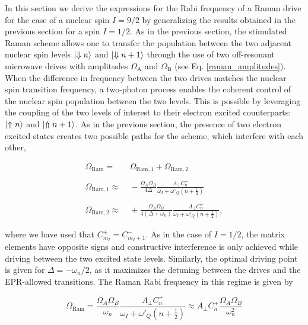 In this section we derive the expressions for the Rabi frequency of a Raman drive for the case of a nuclear spin $I=9/2$ by generalizing the results obtained in the previous section for a spin $I=1/2$. As in the previous section, the stimulated Raman scheme allows one to transfer the population between the two adjacent nuclear spin levels $\ket{\Downarrow n}$ and $\ket{\Downarrow n+1}$ through the use of two off-resonant microwave drives with amplitudes $\Omega_\text{A}$ and $\Omega_\text{B}$ (see Eq. \ref{raman_amplitudes}). When the difference in frequency between the two drives matches the nuclear spin transition frequency, a two-photon process enables the coherent control of the nuclear spin population between the two levels. This is possible by leveraging the coupling of the two levels of interest to their electron excited counterparts: $\ket{\Uparrow n}$ and $\ket{\Uparrow n+1}$. As in the previous section, the presence of two electron excited states creates two possible paths for the scheme, which interfere with each other,

\begin{equation}
\begin{split}    
    \Omega_{\mathrm{Ram}} =&\; \Omega_{\mathrm{Ram},1} +\Omega_{\mathrm{Ram},2} \\ \\
    \Omega_{\mathrm{Ram},1} \approx&\; -\frac{\Omega_A\Omega_B}{4\Delta} \frac{A_\perp C^+_{n}}{\omega_I+\omega'_Q\!\left(n+\tfrac12\right)} \\ \\
    \Omega_{\mathrm{Ram},2} \approx&\; + \frac{\Omega_A\Omega_B}{4\left(\Delta + \omega_n\right)} \frac{A_\perp C^+_{n}}{\omega_I+\omega'_Q\!\left(n+\tfrac12\right)},
\end{split}
\end{equation}

where we have used that $C^+_{m_I} = C^-_{m_I+1}$. As in the case of $I=1/2$, the matrix elements have opposite signs and constructive interference is only achieved while driving between the two excited state levels. Similarly, the optimal driving point is given for $\Delta=-\omega_n/2$, as it maximizes the detuning between the drives and the EPR-allowed transitions. The Raman Rabi frequency in this regime is given by

\begin{equation}
    \Omega_{\mathrm{Ram}} = \frac{\Omega_A\Omega_B}{\omega_n} \frac{A_\perp C^+_{n}}{\omega_I+\omega'_Q\!\left(n+\tfrac12\right)} \approx A_\perp C^+_{n}\frac{\Omega_A\Omega_B}{\omega_n^2}
    \label{eq:stimulated_raman_ninehalf_aperp}
\end{equation}

